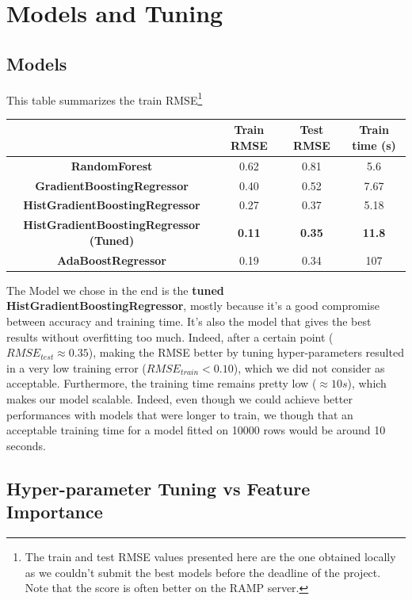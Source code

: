 \documentclass[a4paper,12pt,twoside]{article}
\begin{document}
\section{Models and Tuning}
\subsection{Models}

This table summarizes the train RMSE\footnote{The train and test RMSE values presented here are the one obtained locally as we couldn't submit the best models before the deadline of the project. Note that the score is often better on the RAMP server.} 

\begin{center}
	\begin{tabular}{| c | c | c | c |} 
		\hline
			 & Train RMSE & Test RMSE & Train time (s) \\ [0.5ex] 
		\hline
		\textbf{RandomForest} & 0.62 & 0.81 & 5.6 \\ 
		\hline
		\textbf{GradientBoostingRegressor} & 0.40 & 0.52 & 7.67 \\
		\hline
		\textbf{HistGradientBoostingRegressor} & 0.27 & 0.37 & 5.18 \\
		\hline
		\textbf{HistGradientBoostingRegressor (Tuned)} & \textbf{0.11} & \textbf{0.35} & \textbf{11.8} \\
		\hline
		\textbf{AdaBoostRegressor} & 0.19 & 0.34 & 107 \\
		\hline
	\end{tabular}
\end{center}


The Model we chose in the end is the \textbf{tuned HistGradientBoostingRegressor}, mostly because it's a good compromise between accuracy and training time. It's also the model that gives the best results without overfitting too much. Indeed, after a certain point ($RMSE_{test} \approx 0.35$), making the RMSE better by tuning hyper-parameters resulted in a very low training error ($RMSE_{train} < 0.10$), which we did not consider as acceptable.
Furthermore, the training time remains pretty low ($\approx 10 s$), which makes our model scalable. Indeed, even though we could achieve better performances with models that were longer to train, we though that an acceptable training time for a model fitted on 10000 rows would be around 10 seconds.

\subsection{Hyper-parameter Tuning vs Feature Importance}
\end{document}
